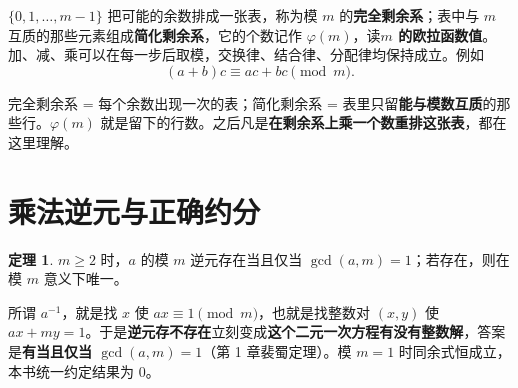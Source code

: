 \documentclass[UTF8,a4paper,11pt,twoside,openright,fontset=fandol]{ctexbook}
\theoremstyle{definition}
\newtheorem{theorem}[definition]{定理}
\begin{document}
$\{0,1,\ldots,m-1\}$ 把可能的余数排成一张表，称为模 $m$ 的\textbf{完全剩余系}；表中与 $m$ 互质的那些元素组成\textbf{简化剩余系}，它的个数记作 $\varphi(m)$，读\textbf{$m$ 的欧拉函数值}。
加、减、乘可以在每一步后取模，交换律、结合律、分配律均保持成立。例如
\[
 (a+b)c\equiv ac+bc\pmod m.
\]

\begin{tip}[剩余系 = 一张余数表]
完全剩余系 = 每个余数出现一次的表；简化剩余系 = 表里只留\textbf{能与模数互质}的那些行。$\varphi(m)$ 就是留下的行数。之后凡是\textbf{在剩余系上乘一个数}\textbf{重排这张表}，都在这里理解。
\end{tip}


\section{乘法逆元与正确约分}
\begin{theorem}
$m\ge2$ 时，$a$ 的模 $m$ 逆元存在当且仅当 $\gcd(a,m)=1$；若存在，则在模 $m$ 意义下唯一。
\end{theorem}

\begin{tip}
所谓 $a^{-1}$，就是找 $x$ 使 $ax\equiv1\pmod m$，也就是找整数对 $(x,y)$ 使 $ax+my=1$。于是\textbf{逆元存不存在}立刻变成\textbf{这个二元一次方程有没有整数解}，答案是\textbf{有当且仅当 $\gcd(a,m)=1$}（第 1 章裴蜀定理）。模 $m=1$ 时同余式恒成立，本书统一约定结果为 $0$。
\end{tip}
\end{document}
